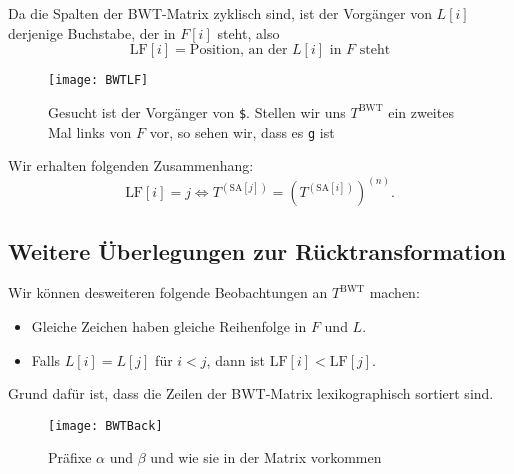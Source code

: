 \begin{minipage}{.65\textwidth}
  Da die Spalten der BWT-Matrix zyklisch sind, ist der Vorgänger von \( L[i] \) derjenige Buchstabe, der in \( F[i] \) steht, also
  \begin{equation*}
    \text{LF}[i] = \text{Position, an der } L[i] \text{ in } F \text{ steht}
  \end{equation*}
\end{minipage}
\hfill
\begin{minipage}{.3\textwidth}
  \begin{figure}[H]
    \texttt{[image: BWTLF]}
    \caption{Gesucht ist der Vorgänger von \texttt{\$}. Stellen wir uns \( T^{\text{BWT}} \) ein zweites Mal links von \( F \) vor, so sehen wir, dass es \texttt{g} ist}
  \end{figure}
\end{minipage}

Wir erhalten folgenden Zusammenhang:
\begin{equation*}
  \text{LF}[i] = j \Leftrightarrow T^{(\text{SA}[j])} = {\left( T^{(\text{SA}[i])} \right)}^{(n)}\text{.}
\end{equation*}

\subsection{Weitere Überlegungen zur Rücktransformation}

Wir können desweiteren folgende Beobachtungen an \( T^{\text{BWT}} \) machen:

\begin{minipage}{.6\textwidth}
  \begin{itemize}
    \item Gleiche Zeichen haben gleiche Reihenfolge in \( F \) und \( L \).
    \item Falls \( L[i] = L[j] \) für \( i < j \), dann ist \( \text{LF}[i] < \text{LF}[j] \).
  \end{itemize}
  Grund dafür ist, dass die Zeilen der BWT-Matrix lexikographisch sortiert sind.
\end{minipage}
\hfill
\begin{minipage}{.35\textwidth}
  \begin{figure}[H]
    \texttt{[image: BWTBack]}
    \caption{Präfixe \( \alpha \) und \( \beta \) und wie sie in der Matrix vorkommen}
  \end{figure}
\end{minipage} \\

